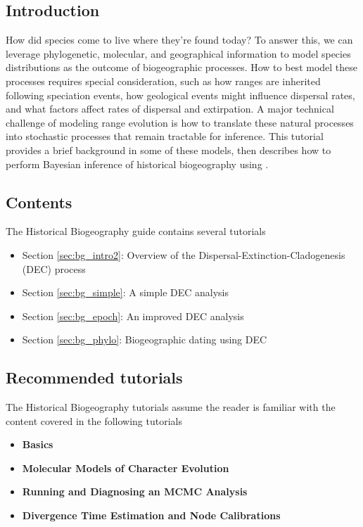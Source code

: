 \subsection*{Introduction}

How did species come to live where they're found today?
To answer this, we can leverage phylogenetic, molecular, and geographical information to model species distributions as the outcome of biogeographic processes.
How to best model these processes requires special consideration, such as how ranges are inherited following speciation events, how geological events might influence dispersal rates, and what factors affect rates of dispersal and extirpation.
A major technical challenge of modeling range evolution is how to translate these natural processes into stochastic processes that remain tractable for inference.
This tutorial provides a brief background in some of these models, then describes how to perform Bayesian inference of historical biogeography using \RevBayes.

\subsection*{Contents}

The Historical Biogeography guide contains several tutorials

\begin{itemize}
\item Section \ref{sec:bg_intro2}: Overview of the Dispersal-Extinction-Cladogenesis (DEC) process
\item Section \ref{sec:bg_simple}: A simple DEC analysis
\item Section \ref{sec:bg_epoch}: An improved DEC analysis
\item Section \ref{sec:bg_phylo}: Biogeographic dating using DEC
\end{itemize}

\subsection*{Recommended tutorials}

The Historical Biogeography tutorials assume the reader is familiar with the content covered in the following \RevBayes tutorials

\begin{itemize}
\item {\bf \large \Rev Basics}
\item {\bf Molecular Models of Character Evolution}
\item {\bf Running and Diagnosing an MCMC Analysis}
\item {\bf Divergence Time Estimation and Node Calibrations}
\end{itemize}

\newpage
